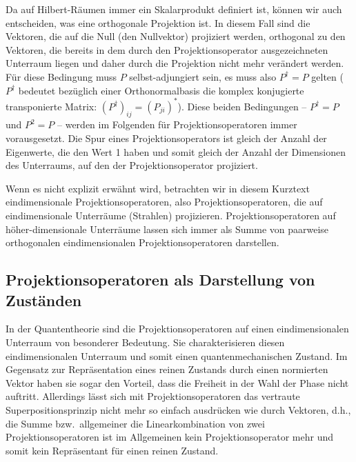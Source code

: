 Da auf Hilbert-R\"aumen immer ein Skalarprodukt definiert ist, k\"onnen wir auch entscheiden, was eine
orthogonale Projektion ist. In diesem Fall sind die Vektoren, die auf die Null (den Nullvektor)
projiziert werden, orthogonal zu den Vektoren, die bereits in dem durch den Projektionsoperator
ausgezeichneten Unterraum liegen und daher
durch die Projektion nicht mehr ver\"andert werden. F\"ur diese Bedingung muss $P$ selbst-adjungiert
sein, es muss also $P^\dagger = P$ gelten ($P^\dagger$ bedeutet bez\"uglich einer Orthonormalbasis die
komplex konjugierte transponierte Matrix: $(P^\dagger)_{ij} = (P_{ji})^*$). 
Diese beiden Bedingungen -- $P^\dagger =P$ und $P^2=P$ --
werden im Folgenden f\"ur Projektionsoperatoren immer vorausgesetzt. Die Spur eines Projektionsoperators
ist gleich der Anzahl der Eigenwerte, die den Wert 1 haben und somit gleich der Anzahl der 
Dimensionen des Unterraums, auf den der Projektionsoperator projiziert. 

Wenn es nicht explizit erw\"ahnt wird, betrachten wir in diesem Kurztext eindimensionale Projektionsoperatoren,
also Projektionsoperatoren, die auf eindimensionale Unterr\"aume (Strahlen) projizieren. Projektionsoperatoren
auf h\"oher-dimensionale Unterr\"aume lassen sich immer als Summe von paarweise orthogonalen
eindimensionalen Projektionsoperatoren darstellen.

\subsection{Projektionsoperatoren als Darstellung von Zust\"anden}

In der Quantentheorie sind die Projektionsoperatoren auf einen eindimensionalen Unterraum
von besonderer Bedeutung. Sie charakterisieren diesen eindimensionalen Unterraum und somit
einen quantenmechanischen Zustand. Im Gegensatz zur Repr\"asentation eines reinen Zustands durch
einen normierten Vektor haben sie sogar den Vorteil, dass die Freiheit in der Wahl der Phase nicht
auftritt. Allerdings l\"asst sich mit Projektionsoperatoren das vertraute Superpositionsprinzip nicht
mehr so einfach ausdr\"ucken wie durch Vektoren, d.h., die
Summe bzw.\ allgemeiner die Linearkombination von zwei Projektionsoperatoren ist im Allgemeinen
kein Projektionsoperator mehr und somit kein Repr\"asentant f\"ur einen reinen Zustand. 

